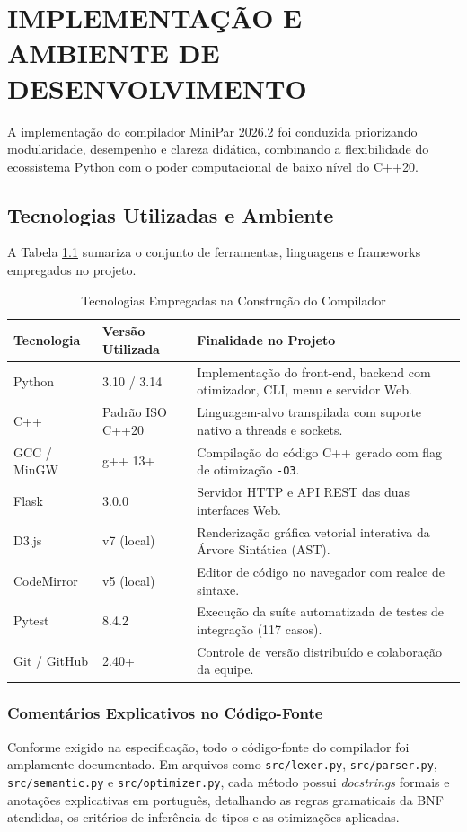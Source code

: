 \chapter{IMPLEMENTAÇÃO E AMBIENTE DE DESENVOLVIMENTO}

A implementação do compilador MiniPar 2026.2 foi conduzida priorizando modularidade, desempenho e clareza didática, combinando a flexibilidade do ecossistema Python com o poder computacional de baixo nível do C++20.

\section{Tecnologias Utilizadas e Ambiente}

A Tabela \ref{tab:tecnologias} sumariza o conjunto de ferramentas, linguagens e frameworks empregados no projeto.

\begin{table}[htbp]
\centering
\caption{Tecnologias Empregadas na Construção do Compilador}
\label{tab:tecnologias}
\small
\begin{tabular}{p{3.2cm}p{3cm}p{7.5cm}}
\toprule
Tecnologia & Versão Utilizada & Finalidade no Projeto \\
\midrule
Python & 3.10 / 3.14 & Implementação do front-end, backend com otimizador, CLI, menu e servidor Web. \\
C++ & Padrão ISO C++20 & Linguagem-alvo transpilada com suporte nativo a threads e sockets. \\
GCC / MinGW & g++ 13+ & Compilação do código C++ gerado com flag de otimização \texttt{-O3}. \\
Flask & 3.0.0 & Servidor HTTP e API REST das duas interfaces Web. \\
D3.js & v7 (local) & Renderização gráfica vetorial interativa da Árvore Sintática (AST). \\
CodeMirror & v5 (local) & Editor de código no navegador com realce de sintaxe. \\
Pytest & 8.4.2 & Execução da suíte automatizada de testes de integração (117 casos). \\
Git / GitHub & 2.40+ & Controle de versão distribuído e colaboração da equipe. \\
\bottomrule
\end{tabular}
\end{table}

\subsection{Comentários Explicativos no Código-Fonte}
Conforme exigido na especificação, todo o código-fonte do compilador foi amplamente documentado. Em arquivos como \texttt{src/lexer.py}, \texttt{src/parser.py}, \texttt{src/semantic.py} e \texttt{src/optimizer.py}, cada método possui \textit{docstrings} formais e anotações explicativas em português, detalhando as regras gramaticais da BNF atendidas, os critérios de inferência de tipos e as otimizações aplicadas.


